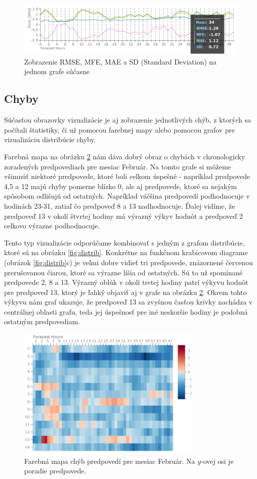 \begin{figure}
	\centering
	\includegraphics[width = 6in]{detail}
	\caption{Zobrazenie RMSE, MFE, MAE a SD (Standard Deviation) na jednom grafe súčasne}
	\label{fig:detail} 
\end{figure}


\subsection{Chyby}

Súčasťou obrazovky vizualizácie je aj zobrazenie jednotlivých chýb, z ktorých sa počítali štatistiky, či už pomocou farebnej mapy alebo pomocou grafov pre vizualizáciu distribúcie chyby.

Farebná mapa na obrázku \ref{fig:errors} nám dáva dobrý obraz o chybách v chronologicky zoradených predpovediach pre mesiac Február. Na tomto grafe si môžeme všimnúť niektoré predpovede, ktoré boli celkom úspešné - napríklad predpovede 4,5 a 12 majú chyby pomerne blízko 0, ale aj predpovede, ktoré sa nejakým spôsobom odlišujú od ostatných. Napríklad väčšina predpovedí podhodnocuje v hodinách 23-31, zatiaľ čo predpoveď 8 a 13 nadhodnocuje. Ďalej vidíme, že predpoveď 13 v okolí štvrtej hodiny má výrazný výkyv hodnôt a predpoveď 2 celkovo výrazne podhodnocuje.

Tento typ vizualizácie odporúčame kombinovať s jedným z grafom distribúcie, ktoré sú na obrázku \ref{fig:distrib}. Konkrétne na funkčnom krabicovom diagrame (obrázok \ref{fig:distrib}c) je veľmi dobre vidieť tri predpovede, znázornené červenou prerušovanou čiarou, ktoré sa výrazne líšia od ostatných. Sú to už spomínané predpovede 2, 8 a 13. Výrazný oblúk v okolí tretej hodiny patrí výkyvu hodnôt pre predpoveď 13, ktorý je ľahký objaviť aj v grafe na obrázku \ref{fig:errors}. Okrem tohto výkyvu nám graf ukazuje, že predpoveď 13 sa zvyšnou časťou krivky nachádza v centrálnej oblasti grafu, teda jej úspešnosť pre iné neskoršie hodiny je podobná ostatným predpovediam.

\begin{figure}
	\centering
	\includegraphics[width = 3.5in]{errors}
	\caption{Farebná mapa chýb predpovedí pre mesiac Február. Na \mbox{$ y $-ovej} osi je poradie predpovede.}
	\label{fig:errors} 
\end{figure}

